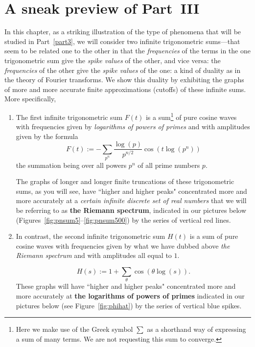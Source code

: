 \documentclass[openany]{book}
\theoremstyle{plain}
\theoremstyle{definition}
\begin{document}
{\chapter{A sneak preview of Part~III}\label{snpr}

   In this chapter, as a striking illustration of the type of phenomena that will be studied in Part~\ref{part3}, we will consider two infinite trigonometric sums---that seem to be related one to the other in that the {\it frequencies} of the terms in the one trigonometric sum give the {\it spike values} of the other, and vice versa:   the {\it frequencies} of the other give the {\it spike values} of the one: a kind of duality as in the theory of Fourier transforms. We show this duality by exhibiting the graphs of more and more accurate finite approximations (cutoffs) of these infinite sums. More specifically,

\begin{enumerate}\item The first infinite trigonometric sum $F(t)$  is a sum{\footnote{Here we
    make use of the Greek symbol $\sum$ as a shorthand way of
    expressing a sum of many terms.  We are not requesting this sum to
    converge.}}  of pure cosine waves with frequencies given by {\it logarithms of powers of primes} and with amplitudes given by the formula $$F(t):=
-\sum_{p^n}{\frac{\log(p)}{p^{n/2}}}\cos(t\log(p^n))
$$ the summation being over all powers $p^n$ of all prime numbers $p$.

The graphs of longer and longer finite truncations of these trigonometric sums, as you will see, have ``higher and higher peaks" concentrated more and more accurately at a  {\it certain infinite discrete set of real numbers} that we will be referring to as {\bf the Riemann spectrum}, indicated in our pictures below (Figures~\ref{fig:pnsum5}--\ref{fig:pnsum500}) by the series of vertical red lines.

\item  In contrast, the second infinite trigonometric sum $H(t)$ is a sum of pure cosine waves with frequencies given by what we have dubbed above {\it the Riemann spectrum} and with amplitudes all equal to $1$.

$$
  H(s):=1+\sum_{\theta}\cos(\theta \log(s)).
 $$ These graphs will have ``higher and higher peaks" concentrated more and more accurately at {\bf the logarithms of powers of primes} indicated in our pictures below (see Figure~\ref{fig:phihat}) by the series of vertical blue spikes.

               \end{enumerate}




}
\end{document}
